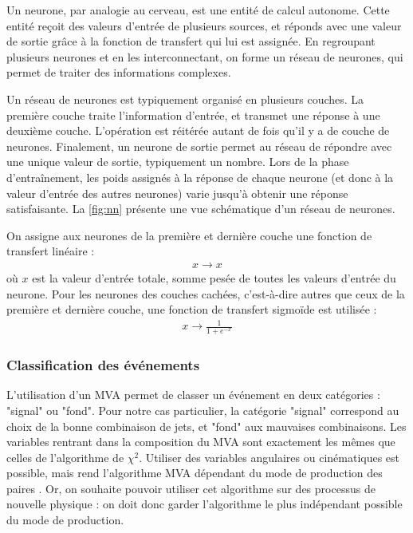 Un neurone, par analogie au cerveau, est une entité de calcul autonome. Cette entité reçoit des valeurs d'entrée de plusieurs sources, et réponds avec une valeur de sortie grâce à la fonction de transfert qui lui est assignée. En regroupant plusieurs neurones et en les interconnectant, on forme un réseau de neurones, qui permet de traiter des informations complexes.

Un réseau de neurones est typiquement organisé en plusieurs couches. La première couche traite l'information d'entrée, et transmet une réponse à une deuxième couche. L'opération est réitérée autant de fois qu'il y a de couche de neurones. Finalement, un neurone de sortie permet au réseau de répondre avec une unique valeur de sortie, typiquement un nombre. Lors de la phase d'entraînement, les poids assignés à la réponse de chaque neurone (et donc à la valeur d'entrée des autres neurones) varie jusqu'à obtenir une réponse satisfaisante. La \cref{fig:nn} présente une vue schématique d'un réseau de neurones.

On assigne aux neurones de la première et dernière couche une fonction de transfert linéaire :
\begin{align*}
  x \rightarrow x
\end{align*}
où $x$ est la valeur d'entrée totale, somme pesée de toutes les valeurs d'entrée du neurone. Pour les neurones des couches cachées, c'est-à-dire autres que ceux de la première et dernière couche, une fonction de transfert sigmoïde est utilisée :
\begin{align*}
  x \rightarrow \frac{1}{1 + e^{-x}}
\end{align*}

\subsubsection{Classification des événements \ttbar}

L'utilisation d'un MVA permet de classer un événement en deux catégories : "signal" ou "fond". Pour notre cas particulier, la catégorie "signal" correspond au choix de la bonne combinaison de jets, et "fond" aux mauvaises combinaisons. Les variables rentrant dans la composition du MVA sont exactement les mêmes que celles de l'algorithme de $\chi^2$. Utiliser des variables angulaires ou cinématiques est possible, mais rend l'algorithme MVA dépendant du mode de production des paires \ttbar. Or, on souhaite pouvoir utiliser cet algorithme sur des processus de nouvelle physique : on doit donc garder l'algorithme le plus indépendant possible du mode de production.

